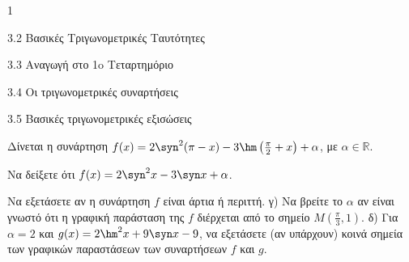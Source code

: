 \begin{ylh}{1}
\item 3.2 Βασικές Τριγωνομετρικές Ταυτότητες
\item 3.3 Αναγωγή στο 1o Τεταρτημόριο
\item 3.4 Οι τριγωνομετρικές συναρτήσεις
\item 3.5 Βασικές τριγωνομετρικές εξισώσεις
\end{ylh}
Δίνεται η συνάρτηση $f(x) = 2\syn ^2(\pi - x) - 3\hm \left(\frac{\pi}{2} + x\right) + \alpha$, με $\alpha \in \mathbb{R}$.
\begin{alist}
\item Να δείξετε ότι $f(x) = 2\syn ^2 x - 3\syn  x + \alpha$.
\item Να εξετάσετε αν η συνάρτηση $f$ είναι άρτια ή περιττή.
 γ) Να βρείτε το $\alpha$ αν είναι γνωστό ότι η γραφική παράσταση της $f$ διέρχεται από το σημείο $M\left(\frac{\pi}{3}, 1\right)$.
 δ) Για $\alpha = 2$ και $g(x) = 2\hm ^2 x + 9\syn  x - 9$, να εξετάσετε (αν υπάρχουν) κοινά σημεία των γραφικών παραστάσεων των συναρτήσεων $f$ και $g$.
\end{alist}

